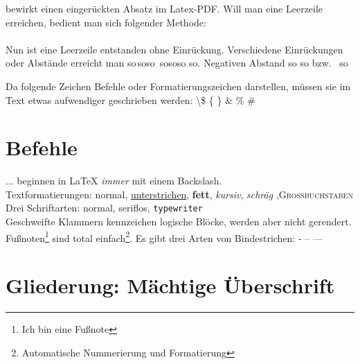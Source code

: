 bewirkt einen eingerückten Absatz im Latex-PDF.
Will man eine Leerzeile erreichen, bedient man sich folgender Methode:\\
\\
Nun ist eine Leerzeile entstanden ohne Einrückung.
Verschiedene Einrückungen oder Abstände erreicht man so\,so\;so\ so\quad so\qquad so \hspace{2.0cm}so. Negativen Abstand s\!o s\!\!o bzw. \ s\!\!\!\!\!o \par
Da folgende Zeichen Befehle oder Formatierungszeichen darstellen, müssen sie im Text etwas aufwendiger geschrieben werden: \textbackslash  \$ \{ \} \& \% \#


\section{Befehle}
... beginnen in \LaTeX{} \emph{immer} mit einem Backslash. \\		%
Textformatierungen: normal, \underline{unterstrichen}, \textbf{fett}, \textit{kursiv}, \textsl{schräg} ,\textsc{Großbuchstaben} \\
Drei Schriftarten: \textnormal{normal}, \textsf{seriflos}, \texttt{typewriter}\\
{Geschweifte \sffamily Klammern { } kennzeichen {\ttfamily logische Blöcke}, werden aber nicht gerendert.} \\[5pt]  					%
Fußnoten\footnote{Ich bin eine Fußnote} sind total einfach\footnote{Automatische Nummerierung und Formatierung}.
Es gibt drei Arten von Bindestrichen: - -- ---



\section{Gliederung: Mächtige Überschrift}

